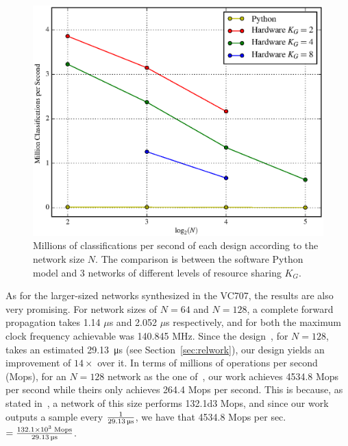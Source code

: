 \documentclass[conference]{IEEEtran}
\begin{document}
\begin{figure}
    \centering
    \includegraphics[width=\linewidth]{figures/Mclass-psec.eps}
    \caption[Millions of classifications per second of each design according to the network size $N$]{Millions of classifications per second of each design according to the network size $N$. The comparison is between the software Python model and 3 networks of different levels of resource sharing $K_G$.}
    \label{fig:Mclass-psec}
\end{figure}

As for the larger-sized networks synthesized in the VC707, the results are also very promising. For network sizes of $N=64$ and $N=128$, a complete
forward propagation takes 1.14 $\mu$s and 2.052 $\mu$s respectively, and for both the maximum clock frequency achievable was 140.845 MHz. Since the
design~\cite{Chang15}, for $N=128$, takes an estimated \SI{29.13}{\micro\second} (see Section~\ref{sec:relwork}), our design yields an improvement of $14\times$
over it.
In terms of millions of operations per second (Mops), for an $N=128$ network as the one of~\cite{Chang15}, our work achieves \num{4534.8} Mops per second
while theirs only achieves \num{264.4} Mops per second. This is because, as stated in~\cite{Chang15}, a network of this size performs \num{132.1d3} Mops, and since
our work outputs a sample every $1 \over \SI{29.13}{\micro\second}$, we have that 4534.8 Mops per sec. $=\frac{\num{132.1d3} \; \text{Mops}}{\SI{29.13}{\micro\second}}$.
\end{document}
